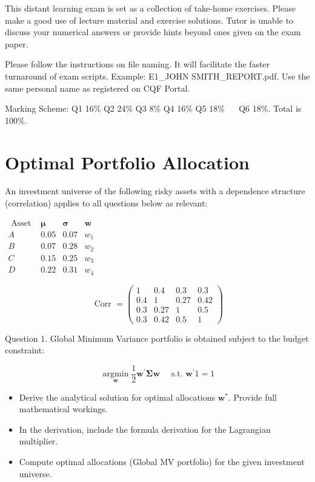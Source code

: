 \documentclass[10pt]{article}
\begin{document}
This distant learning exam is set as a collection of take-home exercises. Please make a good use of lecture material and exercise solutions. Tutor is unable to discuss your numerical answers or provide hints beyond ones given on the exam paper.

Please follow the instructions on file naming. It will facilitate the faster turnaround of exam scripts. Example: E1\_JOHN SMITH\_REPORT.pdf. Use the same personal name as registered on CQF Portal.

Marking Scheme: Q1 16\% Q2 24\% Q3 8\% Q4 16\% Q5 18\% $\quad$ Q6 18\%. Total is 100\%.

\section*{Optimal Portfolio Allocation}
An investment universe of the following risky assets with a dependence structure (correlation) applies to all questions below as relevant:

$\begin{array}{cccc}\text { Asset } & \boldsymbol{\mu} & \boldsymbol{\sigma} & \boldsymbol{w} \\ A & 0.05 & 0.07 & w_{1} \\ B & 0.07 & 0.28 & w_{2} \\ C & 0.15 & 0.25 & w_{3} \\ D & 0.22 & 0.31 & w_{4}\end{array}$

$$
\text { Corr }=\left(\begin{array}{cccc}
1 & 0.4 & 0.3 & 0.3 \\
0.4 & 1 & 0.27 & 0.42 \\
0.3 & 0.27 & 1 & 0.5 \\
0.3 & 0.42 & 0.5 & 1
\end{array}\right)
$$

Question 1. Global Minimum Variance portfolio is obtained subject to the budget constraint:

$$
\underset{\boldsymbol{w}}{\operatorname{argmin}} \frac{1}{2} \boldsymbol{w}^{\prime} \boldsymbol{\Sigma} \boldsymbol{w} \quad \text { s.t. } \boldsymbol{w}^{\prime} 1=1
$$

\begin{itemize}
  \item Derive the analytical solution for optimal allocations $\boldsymbol{w}^{*}$. Provide full mathematical workings.

  \item In the derivation, include the formula derivation for the Lagrangian multiplier.

  \item Compute optimal allocations (Global MV portfolio) for the given investment universe.

\end{itemize}
\end{document}
